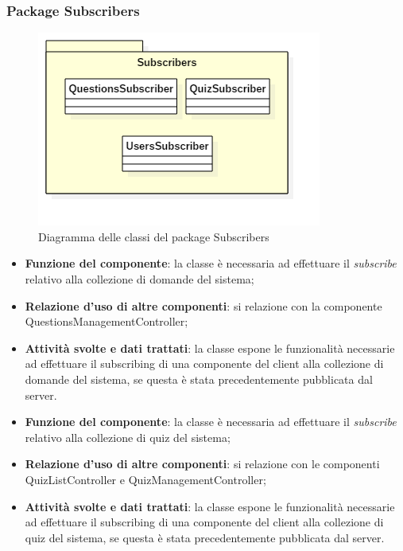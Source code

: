 \subsubsection{Package Subscribers}
\begin{figure}[h!]
\begin{center}
	\includegraphics[scale=0.65]{../images/SubscribersClass.png}
	\caption{Diagramma delle classi del package Subscribers}
\end{center}
\end{figure}


\begin{itemize}
	\item\textbf{Funzione del componente}: la classe è necessaria ad effettuare il \emph{subscribe} relativo alla collezione di domande del sistema;
	\item\textbf{Relazione d'uso di altre componenti}: si relazione con la componente QuestionsManagementController;
	\item\textbf{Attività svolte e dati trattati}: la classe espone le funzionalità necessarie ad effettuare il subscribing di una componente del client alla collezione di domande del sistema, se questa è stata precedentemente pubblicata dal server.
\end{itemize}


\begin{itemize}
	\item\textbf{Funzione del componente}: la classe è necessaria ad effettuare il \emph{subscribe} relativo alla collezione di quiz del sistema;
	\item\textbf{Relazione d'uso di altre componenti}: si relazione con le componenti QuizListController e QuizManagementController;
	\item\textbf{Attività svolte e dati trattati}: la classe espone le funzionalità necessarie ad effettuare il subscribing di una componente del client alla collezione di quiz del sistema, se questa è stata precedentemente pubblicata dal server.
\end{itemize}

